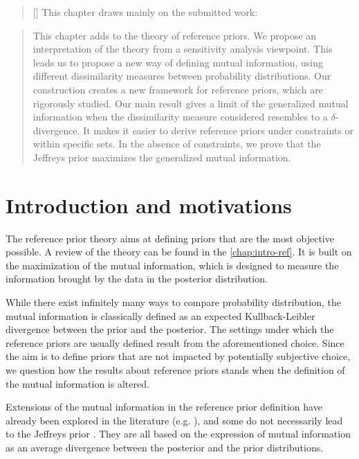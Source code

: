 
\begin{abstract}[\hspace*{-10pt}]
    This chapter draws mainly on the submitted work:   %
\end{abstract}

\begin{abstract}
    This chapter adds to the theory of reference priors. We propose an interpretation of the theory from a sensitivity analysis viewpoint. This leads us to propose a new way of defining mutual information, using different dissimilarity measures between probability distributions. 
    Our construction  creates a new framework for reference priors, which are rigorously studied.
    Our main result gives a limit of the generalized mutual information when the dissimilarity measure considered resembles to a $\delta$-divergence.
    It makes it easier to derive reference priors under constraints or within specific sets. In the absence of constraints, we prove that the Jeffreys prior maximizes the generalized mutual information.
\end{abstract}

\minitoc

\section{Introduction and motivations}

The reference prior theory aims at defining priors that are the most objective possible. A review of the theory can be found in the \cref{chap:intro-ref}. It is built on the maximization of the mutual information, which is designed to measure the information brought by the data in the posterior distribution.

While there exist infinitely many ways to compare probability distribution, the mutual information is classically defined as an expected Kullback-Leibler divergence between the prior and the posterior.
The settings under which the reference priors are usually defined result from the aforementioned choice. Since the aim is to define priors that are not impacted by potentially subjective choice, we question how the results about reference priors stands when the definition of the mutual information is altered.

Extensions of the mutual information in the reference prior definition have already been explored in the literature (e.g. \cite{chen_objective_2010,liu_divergence_2014,le_formal_2014}), and some do not necessarily lead to the Jeffreys prior \citep{hashimoto_reference_2021,clarke_reference_1997,ghosh_general_2011}. They are all based on the expression of mutual information as an average divergence between the posterior and the prior distributions.




